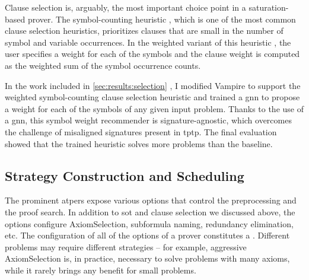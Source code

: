 Clause selection is, arguably, the most important choice point in a saturation-based prover.
The symbol-counting heuristic \cite{DBLP:conf/cade/SchulzM16}, which is one of the most common clause selection heuristics,
prioritizes clauses that are small in the number of symbol and variable occurrences.
In the weighted variant of this heuristic \cite{E-manual},
the user specifies a weight for each of the symbols
and
the clause weight is computed as the weighted sum of the symbol occurrence counts.

In the work included in \cref{sec:results:selection} \cite{DBLP:conf/lpar/Bartek023},
I modified Vampire to support the weighted symbol-counting clause selection heuristic
and trained a \gls{gnn} to propose a weight for each of the symbols of any given input problem.
Thanks to the use of a \gls{gnn}, this symbol weight recommender is signature-agnostic,
which overcomes the challenge of misaligned signatures present in \gls{tptp}.
The final evaluation showed that
the trained heuristic solves  more problems than the baseline.


\subsection{Strategy Construction and Scheduling}
\label{sec:contrib:schedules}

The prominent \glspl{atper} expose various options that control the preprocessing and the proof search.
In addition to \gls{sot} and clause selection we discussed above,
the options configure \gls{AxiomSelection}, subformula naming, redundancy elimination, etc.
The configuration of all of the options of a prover constitutes a .
Different problems may require different strategies -- for example, aggressive \gls{AxiomSelection} is, in practice, necessary to solve problems with many axioms, while it rarely brings any benefit for small problems.

